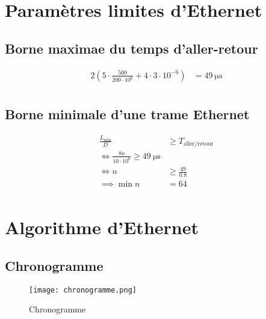 \documentclass{article}
\begin{document}
\section{Paramètres limites d'Ethernet}

\subsection{Borne maximae du temps d'aller-retour}

\begin{align*}
    2 \left(5 \cdot \frac{500}{200 \cdot 10^{6}} + 4  \cdot 3  \cdot 10^{-6}\right) &= \SI{49}{\micro\second} \\
\end{align*}

\subsection{Borne minimale d'une trame Ethernet}

\begin{align*}
    \frac{L_{\text{min}}}{D} &\ge T_{\text{aller/retour}} \\
    \iff \frac{8n}{10 \cdot 10^{6}} \ge \SI{49}{\micro\second} \\
    \iff n &\ge \frac{49}{0.8} \\
    \implies \min n &= 64 \\
\end{align*}

\section{Algorithme d'Ethernet}

\subsection{Chronogramme}
\begin{figure}[H]
    \centering
    \texttt{[image: chronogramme.png]}
    \caption{Chronogramme}
    \label{fig:chronogramme}
\end{figure}
\end{document}
